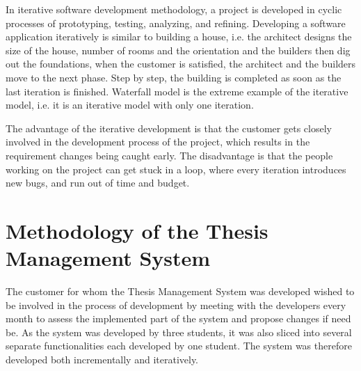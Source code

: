 In iterative software development methodology, a project is developed in cyclic processes of prototyping, testing, analyzing, and refining. Developing a software application iteratively is similar to building a house, i.e. the architect designs the size of the house, number of rooms and the orientation and the builders then dig out the foundations, when the customer is satisfied, the architect and the builders move to the next phase. Step by step, the building is completed as soon as the last iteration is finished. Waterfall model is the extreme example of the iterative model, i.e. it is an iterative model with only one iteration.

The advantage of the iterative development is that the customer gets closely involved in the development process of the project, which results in the requirement changes being caught early. The disadvantage is that the people working on the project can get stuck in a loop, where every iteration introduces new bugs, and run out of time and budget.

\section{Methodology of the Thesis Management System}

The customer for whom the Thesis Management System was developed wished to be involved in the process of development by meeting with the developers every month to assess the implemented part of the system and propose changes if need be. As the system was developed by three students, it was also sliced into several separate functionalities each developed by one student. The system was therefore developed both incrementally and iteratively.